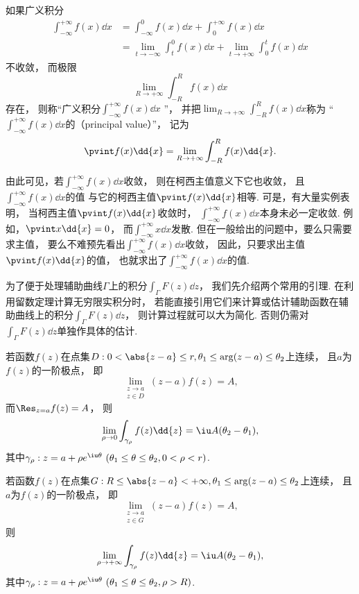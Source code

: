 如果广义积分\begin{align*}
	\int_{-\infty}^{+\infty} f(x) \dd{x}
	&= \int_{-\infty}^0 f(x) \dd{x} + \int_0^{+\infty} f(x) \dd{x} \\
	&= \lim_{t \to -\infty} \int_t^0 f(x) \dd{x}
		+ \lim_{t \to +\infty} \int_0^t f(x) \dd{x}
\end{align*}不收敛，
而极限\[
	\lim_{R\to+\infty} \int_{-R}^R f(x) \dd{x}
\]存在，
则称“广义积分\(\int_{-\infty}^{+\infty} f(x) \dd{x}\) ”，
并把\(\lim_{R\to+\infty} \int_{-R}^R f(x) \dd{x}\)称为
“\(\int_{-\infty}^{+\infty} f(x) \dd{x}\)的（principal value）”，
记为\[
	\pvint f(x) \dd{x}
	= \lim_{R\to+\infty} \int_{-R}^R f(x) \dd{x}.
\]

由此可见，若\(\int_{-\infty}^{+\infty} f(x) \dd{x}\)收敛，
则在柯西主值意义下它也收敛，
且\(\int_{-\infty}^{+\infty} f(x) \dd{x}\)的值
与它的柯西主值\(\pvint f(x) \dd{x}\)相等.
可是，有大量实例表明，
当柯西主值\(\pvint f(x) \dd{x}\)收敛时，
\(\int_{-\infty}^{+\infty} f(x) \dd{x}\)本身未必一定收敛.
例如，\(\pvint x \dd{x} = 0\)，
而\(\int_{-\infty}^{+\infty} x \dd{x}\)发散.
但在一般给出的问题中，要么只需要求主值，
要么不难预先看出\(\int_{-\infty}^{+\infty} f(x) \dd{x}\)收敛，
因此，只要求出主值\(\pvint f(x) \dd{x}\)的值，
也就求出了\(\int_{-\infty}^{+\infty} f(x) \dd{x}\)的值.

为了便于处理辅助曲线\(\Gamma\)上的积分\(\int_\Gamma F(z) \dd{z}\)，
我们先介绍两个常用的引理.
在利用留数定理计算无穷限实积分时，
若能直接引用它们来计算或估计辅助函数在辅助曲线上的积分\(\int_\Gamma F(z) \dd{z}\)，
则计算过程就可以大为简化.
否则仍需对\(\int_\Gamma F(z) \dd{z}\)单独作具体的估计.

\begin{lemma}\label{theorem:留数定理.计算积分路径上没有奇点的无穷限积分.引理1}
若函数\(f(z)\)在点集\(D: 0<\abs{z-a}\leq r, \theta_1 \leq \arg(z-a) \leq \theta_2\)上连续，
且\(a\)为\(f(z)\)的一阶极点，
即\begin{equation}
	\lim_{\substack{z \to a \\ z \in D}} (z-a) f(z) = A,
\end{equation}
而\(\Res_{z=a} f(z) = A\)，
则\begin{equation}
	\lim_{\rho\to0} \int_{\gamma_{\rho}} f(z) \dd{z}
	= \iu A (\theta_2-\theta_1),
\end{equation}
其中\(\gamma_{\rho}: z=a+\rho e^{\iu\theta}\ (\theta_1 \leq \theta \leq \theta_2, 0 < \rho < r)\).

若函数\(f(z)\)在点集\(G: R \leq \abs{z-a} < +\infty, \theta_1 \leq \arg(z-a) \leq \theta_2\)上连续，
且\(a\)为\(f(z)\)的一阶极点，
即\begin{equation}
	\lim_{\substack{z \to a \\ z \in G}} (z-a) f(z) = A,
\end{equation}
则\begin{equation}
	\lim_{\rho\to+\infty} \int_{\gamma_{\rho}} f(z) \dd{z}
	= \iu A (\theta_2-\theta_1),
\end{equation}
其中\(\gamma_{\rho}: z=a+\rho e^{\iu\theta}\ (\theta_1 \leq \theta \leq \theta_2, \rho > R)\).
\end{lemma}

